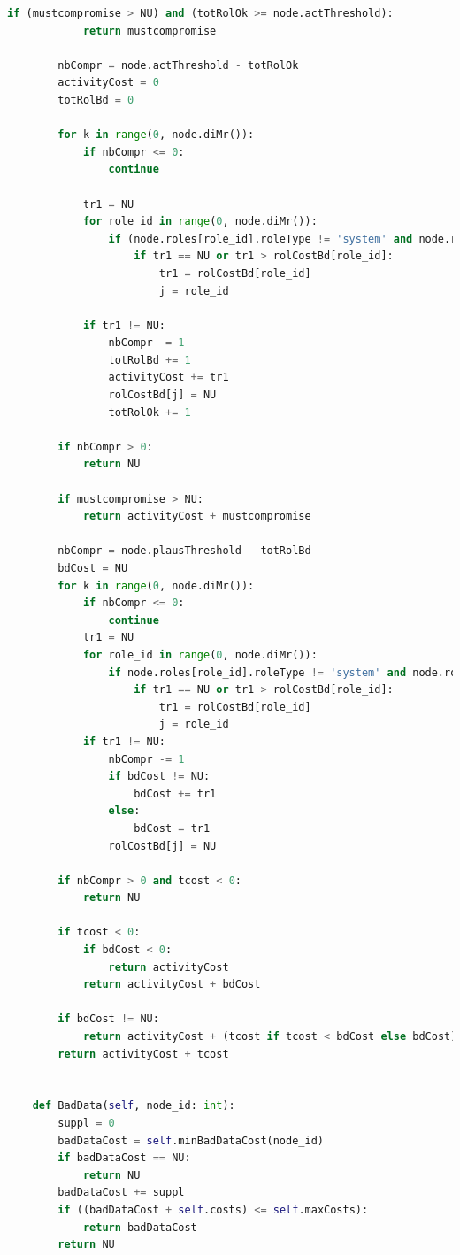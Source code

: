 \documentclass[a4paper]{article}
\begin{document}
\begin{appendices}
\begin{lstlisting}[language=python]
        if (mustcompromise > NU) and (totRolOk >= node.actThreshold):
            return mustcompromise

        nbCompr = node.actThreshold - totRolOk
        activityCost = 0
        totRolBd = 0
        
        for k in range(0, node.diMr()):
            if nbCompr <= 0:
                continue

            tr1 = NU
            for role_id in range(0, node.diMr()):
                if (node.roles[role_id].roleType != 'system' and node.roles[role_id].category == 'optional' and rolCostBd[role_id] != None and not rolOk[role_id]):
                    if tr1 == NU or tr1 > rolCostBd[role_id]:
                        tr1 = rolCostBd[role_id]
                        j = role_id
            
            if tr1 != NU:
                nbCompr -= 1
                totRolBd += 1
                activityCost += tr1
                rolCostBd[j] = NU
                totRolOk += 1

        if nbCompr > 0:
            return NU

        if mustcompromise > NU:
            return activityCost + mustcompromise

        nbCompr = node.plausThreshold - totRolBd
        bdCost = NU
        for k in range(0, node.diMr()):
            if nbCompr <= 0:
                continue
            tr1 = NU
            for role_id in range(0, node.diMr()):
                if node.roles[role_id].roleType != 'system' and node.roles[role_id].category == 'optional' and rolCostBd[role_id] and rolOk[role_id]:
                    if tr1 == NU or tr1 > rolCostBd[role_id]:
                        tr1 = rolCostBd[role_id]
                        j = role_id
            if tr1 != NU:
                nbCompr -= 1
                if bdCost != NU:
                    bdCost += tr1
                else:
                    bdCost = tr1
                rolCostBd[j] = NU
        
        if nbCompr > 0 and tcost < 0:
            return NU

        if tcost < 0:
            if bdCost < 0:
                return activityCost
            return activityCost + bdCost

        if bdCost != NU:
            return activityCost + (tcost if tcost < bdCost else bdCost)
        return activityCost + tcost


    def BadData(self, node_id: int):
        suppl = 0
        badDataCost = self.minBadDataCost(node_id)
        if badDataCost == NU:
            return NU
        badDataCost += suppl
        if ((badDataCost + self.costs) <= self.maxCosts):
            return badDataCost
        return NU



\end{lstlisting}
\end{appendices}
\end{document}

